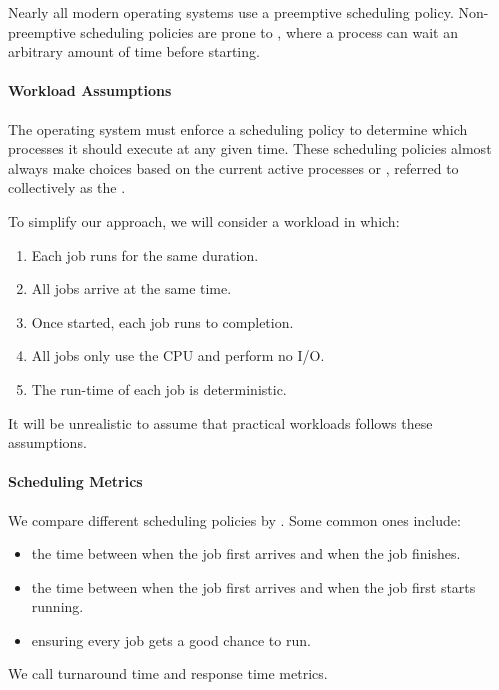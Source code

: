 Nearly all modern operating systems use a preemptive scheduling policy. Non-preemptive scheduling policies are prone to , where a process can wait an arbitrary amount of time before starting.

\paragraph{Workload Assumptions}
The operating system must enforce a scheduling policy to determine which processes it should execute at any given time. These scheduling policies almost always make choices based on the current active processes or , referred to collectively as the .

To simplify our approach, we will consider a workload in which:

\begin{enumerate}[noitemsep]
    \item Each job runs for the same duration.
    \item All jobs arrive at the same time.
    \item Once started, each job runs to completion.
    \item All jobs only use the CPU and perform no I/O.
    \item The run-time of each job is deterministic.
\end{enumerate}

It will be unrealistic to assume that practical workloads follows these assumptions. 

\paragraph{Scheduling Metrics}
We compare different scheduling policies by . Some common ones include:
\begin{itemize}
    \item {} the time between when the job first arrives and when the job finishes.
    \item {} the time between when the job first arrives and when the job first starts running.
    \item {} ensuring every job gets a good chance to run.
\end{itemize}

We call turnaround time and response time  metrics.


